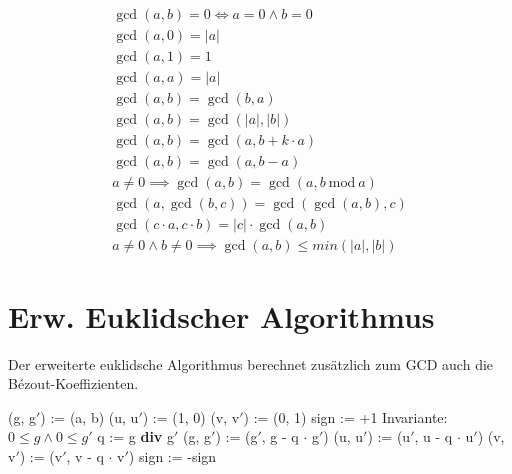 \documentclass[a4paper, ngerman, landscape, fleqn]{article}
\newcommand{\Mod}{\ \mathrm{mod}\ }
\begin{document}
\begin{multicols*}{3}
\begin{align*}
    \gcd(a, b) = 0 \iff a = 0 \wedge b = 0 \\
    \gcd(a, 0) = |a| \\
    \gcd(a, 1) = 1 \\
    \gcd(a, a) = |a| \\
    \gcd(a, b) = \gcd(b, a) \\
    \gcd(a, b) = \gcd(|a|, |b|) \\
    \gcd(a, b) = \gcd(a, b + k \cdot a) \\
    \gcd(a, b) = \gcd(a, b - a) \\
    a \neq 0 \implies \gcd(a, b) = \gcd(a, b \Mod a) \\
    \gcd(a, \gcd(b, c)) = \gcd(\gcd(a, b), c) \\
    \gcd(c \cdot a, c \cdot b) = |c| \cdot \gcd(a, b) \\
    a \neq 0 \wedge b \neq 0 \implies \gcd(a, b) \leq min(|a|, |b|)
\end{align*}

\section*{Erw. Euklidscher Algorithmus}

Der erweiterte euklidsche Algorithmus berechnet zusätzlich zum GCD auch die Bézout-Koeffizienten.

\begin{algorithmic}
        \State {}
        \State {}
        \Statex
        \State {}
        \State {}
        \State {}
        \State {}
        \State {}
        \State {}
        \State {}
        \State {}
        \Statex
        \State (g, g$'$) := (a, b)
        \State (u, u$'$) := (1, 0)
        \State (v, v$'$) := (0, 1)
        \State sign := +1
        \Statex
            \State \Comment Invariante: $0 \leq g \wedge 0 \leq g'$
            \State q := g \textbf{div} g$'$
            \State (g, g$'$) := (g$'$, g - q $\cdot$ g$'$)
            \State (u, u$'$) := (u$'$, u - q $\cdot$ u$'$)
            \State (v, v$'$) := (v$'$, v - q $\cdot$ v$'$) 
            \State sign := -sign
        \EndWhile


\end{algorithmic}
\end{multicols*}
\end{document}

